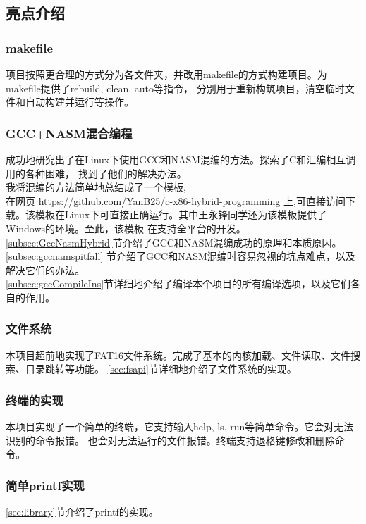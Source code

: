 \documentclass[a4paper]{article}
\begin{document}
    \subsection{亮点介绍}
    \subsubsection{makefile}
    项目按照更合理的方式分为各文件夹，并改用makefile的方式构建项目。为makefile提供了rebuild, clean, auto等指令，
    分别用于重新构筑项目，清空临时文件和自动构建并运行等操作。
    \subsubsection{GCC+NASM混合编程}
    成功地研究出了在Linux下使用GCC和NASM混编的方法。探索了C和汇编相互调用的各种困难，
    找到了他们的解决办法。\\

    我将混编的方法简单地总结成了一个模板,
    \\ 在网页 \url{https://github.com/YanB25/c-x86-hybrid-programming}
     上,可直接访问下载。该模板在Linux下可直接正确运行。其中王永锋同学还为该模板提供了Windows的环境。至此，该模板
     在支持全平台的开发。 \\

    \ref{subsec:GccNasmHybrid}节介绍了GCC和NASM混编成功的原理和本质原因。    \\
    \ref{subsec:gccnamspitfall} 节介绍了GCC和NASM混编时容易忽视的坑点难点，以及解决它们的办法。\\
    \ref{subsec:gccCompileIns}节详细地介绍了编译本个项目的所有编译选项，以及它们各自的作用。\\

    \subsubsection{文件系统}
    本项目超前地实现了FAT16文件系统。完成了基本的内核加载、文件读取、文件搜索、目录跳转等功能。
    \ref{sec:fsapi}节详细地介绍了文件系统的实现。
    \subsubsection{终端的实现}
    本项目实现了一个简单的终端，它支持输入help, ls, run等简单命令。它会对无法识别的命令报错。
    也会对无法运行的文件报错。终端支持退格键修改和删除命令。
    \subsubsection{简单printf实现}
    \ref{sec:library}节介绍了printf的实现。
\end{document}
